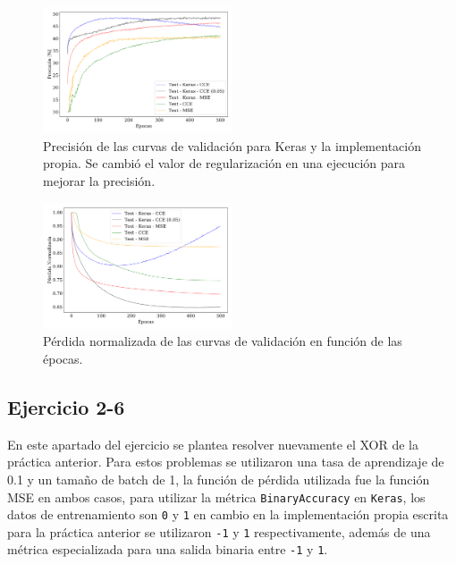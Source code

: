     \begin{figure}[H]
        \begin{small}
            \begin{center}
                \includegraphics[width=0.5\textwidth]{Graphs/ejer2_4_acc.pdf}
            \end{center}
            \caption{Precisión de las curvas de validación para Keras y la implementación propia. Se cambió el valor de regularización en una ejecución para mejorar la precisión.}
            \label{fig:ejer2_4_acc}
        \end{small}
    \end{figure}


    \begin{figure}[H]
        \begin{small}
            \begin{center}
                \includegraphics[width=0.5\textwidth]{Graphs/ejer2_4_loss.pdf}
            \end{center}
            \caption{Pérdida normalizada de las curvas de validación en función de las épocas.}
            \label{fig:ejer2_4_loss}
        \end{small}
    \end{figure}


\subsection*{Ejercicio 2-6}

    En este apartado del ejercicio se plantea resolver nuevamente el XOR de la práctica anterior. Para estos problemas se utilizaron una tasa de aprendizaje de 0.1 y un tamaño de batch de 1, la función de pérdida utilizada fue la función MSE en ambos casos, para utilizar la métrica \verb|BinaryAccuracy| en \verb|Keras|, los datos de entrenamiento son \verb|0| y \verb|1| en cambio en la implementación propia escrita para la práctica anterior se utilizaron   \verb|-1| y \verb|1| respectivamente, además de una métrica especializada para una salida binaria entre  \verb|-1| y \verb|1|.


